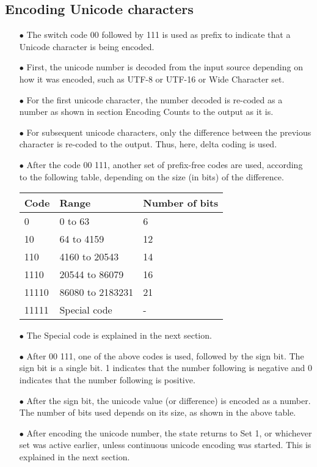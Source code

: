\documentclass[]{article}
\begin{document}
\subsection{Encoding Unicode characters}
\begin{itemize}
	\item[$\bullet$] The switch code 00 followed by 111 is used as prefix to indicate that a Unicode character is being encoded.
	\item[$\bullet$] First, the unicode number is decoded from the input source depending on how it was encoded, such as UTF-8 or UTF-16 or Wide Character set.
	\item[$\bullet$] For the first unicode character, the number decoded is re-coded as a number as shown in section Encoding Counts to the output as it is.
	\item[$\bullet$] For subsequent unicode characters, only the difference between the previous character is re-coded to the output.  Thus, here, delta coding is used.
	\item[$\bullet$] After the code 00 111, another set of prefix-free codes are used, according to the following table, depending on the size (in bits) of the difference.
	\item[] \begin{tabular}{ | l | l | l |} \hline
		\textbf{Code} & \textbf{Range} & \textbf{Number of bits} \\ \hline
		0 & 0 to 63 & 6 \\ \hline
		10 & 64 to 4159 & 12 \\ \hline
		110 & 4160 to 20543 & 14 \\ \hline
		1110 & 20544 to 86079 & 16 \\ \hline
		11110 & 86080 to 2183231 & 21 \\ \hline
		11111 & Special code & - \\ \hline
		\end{tabular}
	\item[$\bullet$] The Special code is explained in the next section.
	\item[$\bullet$] After 00 111, one of the above codes is used, followed by the sign bit.  The sign bit is a single bit.  1 indicates that the number following is negative and 0 indicates that the number following is positive.
	\item[$\bullet$] After the sign bit, the unicode value (or difference) is encoded as a number.  The number of bits used depends on its size, as shown in the above table.
	\item[$\bullet$] After encoding the unicode number, the state returns to Set 1, or whichever set was active earlier, unless continuous unicode encoding was started.  This is explained in the next section.
\end{itemize}
\end{document}
